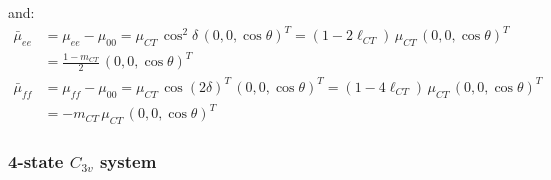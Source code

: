\documentclass[journal=jpcafh]{achemso}
\begin{document}
and:
\begin{align}
	\bar\mu_{ee}&= \mu_{ee}-\mu_{00} = \mu_{CT}\,\cos^2\delta\,(0, 0, \cos\theta)^T = (1-2\ell_{CT})\,\mu_{CT}\,(0, 0, \cos\theta)^T \nonumber\\
	&= \frac{1-m_{CT}}{2}\,(0,0,\cos\theta)^T \\
	\bar\mu_{ff} &= \mu_{ff}-\mu_{00} = \mu_{CT}\,\cos(2\delta)^T\,(0, 0, \cos\theta)^T = (1-4\ell_{CT})\,\mu_{CT}\,(0, 0, \cos\theta)^T\nonumber\\ 
	&= -m_{CT}\,\mu_{CT}\,(0, 0, \cos\theta)^T
\end{align}

\subsubsection{4-state $C_{3v}$ system}
\end{document}
